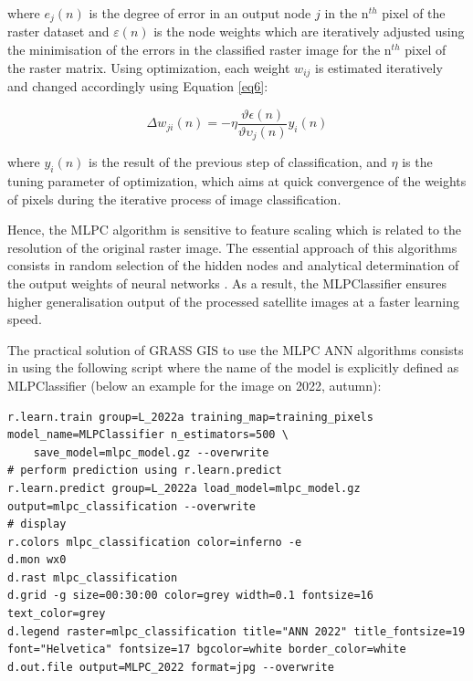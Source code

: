 \documentclass{elektr}
\begin{document}
where $e_j(n)$ is the degree of error in an output node $j$ in the n$^{th}$  pixel of the raster dataset and $\varepsilon(n)$ is the node weights which are iteratively adjusted using the minimisation of the errors in the classified raster image for the n$^{th}$ pixel of the raster matrix. Using optimization, each weight $w_{ij}$ is estimated iteratively and changed accordingly using Equation \ref{eq6}: 

\begin{equation}
\Delta w_{ji}(n)=-\eta\frac{\vartheta\epsilon(n)}{\vartheta\upsilon_{j}(n)}y_{i}(n)
\label{eq6}
\end{equation}

where $y_{i}(n)$ is the result of the previous step of classification, and $\eta$ is the tuning parameter of optimization, which aims at quick convergence of the weights of pixels during the iterative process of image classification.

Hence, the MLPC algorithm is sensitive to feature scaling which is related to the resolution of the original raster image. The essential approach of this algorithms consists in random selection of the hidden nodes and analytical determination of the output weights of neural networks \cite{HUANG2006489}. As a result, the MLPClassifier ensures higher generalisation output of the processed satellite images at a faster learning speed. 

The practical solution of GRASS GIS to use the MLPC ANN algorithms consists in using the following script where the name of the model is explicitly defined as MLPClassifier (below an example for the image on 2022, autumn): 

\begin{footnotesize}
\begin{verbatim}
r.learn.train group=L_2022a training_map=training_pixels model_name=MLPClassifier n_estimators=500 \
    save_model=mlpc_model.gz --overwrite
# perform prediction using r.learn.predict
r.learn.predict group=L_2022a load_model=mlpc_model.gz output=mlpc_classification --overwrite
# display
r.colors mlpc_classification color=inferno -e
d.mon wx0
d.rast mlpc_classification
d.grid -g size=00:30:00 color=grey width=0.1 fontsize=16 text_color=grey
d.legend raster=mlpc_classification title="ANN 2022" title_fontsize=19 font="Helvetica" fontsize=17 bgcolor=white border_color=white
d.out.file output=MLPC_2022 format=jpg --overwrite
\end{verbatim}
\end{footnotesize}
\end{document}
